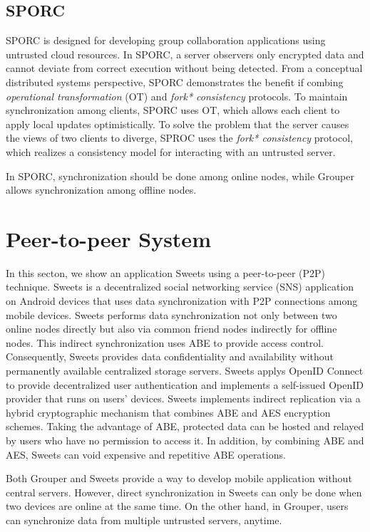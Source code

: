 \documentclass[a4paper,11pt]{report}
\begin{document}
\subsection{SPORC}

SPORC\cite{feldman2010sporc} is designed for developing group collaboration applications using untrusted cloud resources.
In SPORC, a server observers only encrypted data and cannot deviate from correct execution without being detected.
From a conceptual distributed systems perspective, SPORC demonstrates the benefit if combing \emph{operational transformation} (OT)\cite{ellis1989concurrency} and \emph{fork* consistency}  protocols\cite{li2007beyond}.
To maintain synchronization among clients, SPORC uses OT, which allows each client to apply local updates optimistically.
To solve the problem that the server causes the views of two clients to diverge, SPROC uses the \emph{fork* consistency} protocol, which realizes a consistency model for interacting with an untrusted server.

In SPORC, synchronization should be done among online nodes, while Grouper allows synchronization among offline nodes.

\section{Peer-to-peer System}

In this secton, we show an application Sweets\cite{sweets} using a peer-to-peer (P2P) technique. 
Sweets is a decentralized social networking service (SNS) application on Android devices that uses data synchronization with P2P connections among mobile devices. 
Sweets performs data synchronization not only between two online nodes directly but also via common friend nodes indirectly for offline nodes.
This indirect synchronization uses ABE to provide access control.
Consequently, Sweets provides data confidentiality and availability without permanently available centralized storage servers.
Sweets applys OpenID Connect\cite{openidconnect} to provide decentralized user authentication and implements a self-issued OpenID provider\cite{openid}  that runs on users’ devices.
Sweets implements indirect replication via a hybrid cryptographic mechanism that combines ABE and AES encryption schemes. 
Taking the advantage of ABE, protected data can be hosted and relayed by users who have no permission to access it. 
In addition, by combining ABE and AES, Sweets can void expensive and repetitive ABE operations.

Both Grouper and Sweets provide a way to develop mobile application without central servers.
However, direct synchronization in Sweets can only be done when two devices are online at the same time. 
On the other hand, in Grouper, users can synchronize data from multiple untrusted servers, anytime.
\end{document}
